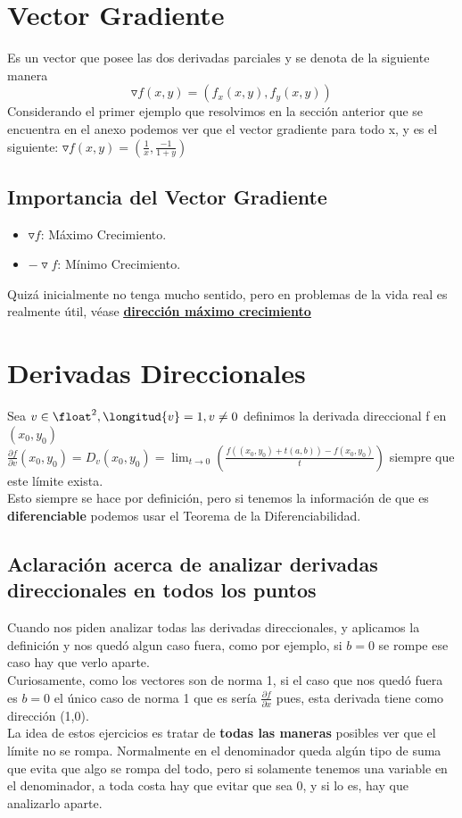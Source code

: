 \documentclass[10pt,a4paper]{article}
\begin{document}
\section*{Vector Gradiente}
Es un vector que posee las dos derivadas parciales y se denota de la siguiente manera
\[\triangledown f(x,y) = (f_{x}(x,y), f_{y}(x,y))\]
Considerando el primer ejemplo que resolvimos en la sección anterior que se encuentra en el anexo podemos ver que el vector gradiente para todo x, y es el siguiente: $\triangledown f(x, y) = (\frac{1}{x}, \frac{-1}{1+y})$
\subsection*{Importancia del Vector Gradiente}
\begin{itemize}
    \item $\triangledown f$: Máximo Crecimiento.
    \item $- \triangledown f$: Mínimo Crecimiento.
\end{itemize}
Quizá inicialmente no tenga mucho sentido, pero en problemas de la vida real es realmente útil, véase \hyperref[subsec:direccion_maximo_crecimiento]{\underline{\textbf{dirección máximo crecimiento}}}

\section*{Derivadas Direccionales}
Sea $v \in \float^{2}, \longitud{v} = 1, v \neq 0$ definimos la derivada direccional f en $(x_{0}, y_{0})$ \\ 
$\frac{\partial f}{\partial v}(x_{0}, y_{0}) = D_{v}(x_{0}, y_{0}) = \lim_{t \to 0} \left(\frac{f((x_{0}, y_{0}) + t(a, b)) - f(x_{0}, y_{0})}{t} \right) $ siempre que este límite exista. \\
Esto siempre se hace por definición, pero si tenemos la información de que es \textbf{diferenciable} podemos usar el Teorema de la Diferenciabilidad. 
\subsection*{Aclaración acerca de analizar derivadas direccionales en \textbf{todos} los puntos}
Cuando nos piden analizar todas las derivadas direccionales, y aplicamos la definición y nos quedó algun caso fuera, como por ejemplo, si $b = 0$ se rompe ese caso hay que verlo aparte. \\
Curiosamente, como los vectores son de norma 1, si el caso que nos quedó fuera es $b=0$ el único caso de norma 1 que es sería $\frac{\partial f}{\partial x}$ pues, esta derivada tiene como dirección (1,0). \\
La idea de estos ejercicios es tratar de \textbf{todas las maneras} posibles ver que el límite no se rompa. Normalmente en el denominador queda algún tipo de suma que evita que algo se rompa del todo, pero si solamente tenemos una variable en el denominador, a toda costa hay que evitar que sea 0, y si lo es, hay que analizarlo aparte. 
\end{document}
